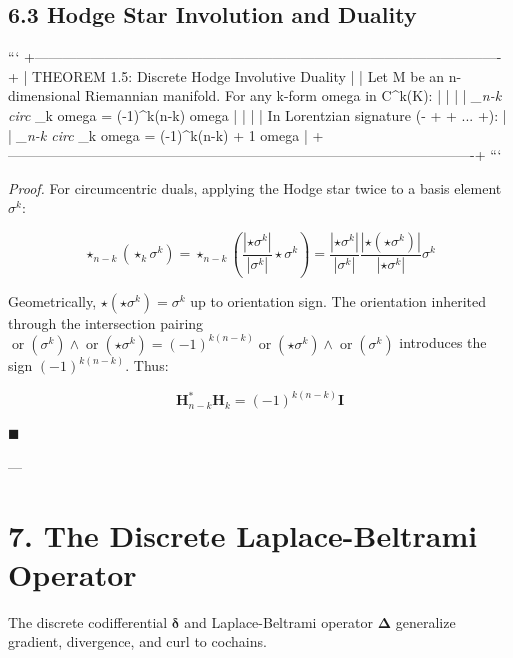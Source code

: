 \documentclass[11pt,twoside,openright]{amsbook}
\begin{document}
\subsection{6.3 Hodge Star Involution and Duality}

```
+----------------------------------------------------------------------------------------------------+
| THEOREM 1.5: Discrete Hodge Involutive Duality                                                     |
| Let M be an n-dimensional Riemannian manifold. For any k-form omega in C^k(K):                     |
|                                                                                                    |
|   \textit{_{n-k} circ }_k omega = (-1)^{k(n-k)} omega                                                     |
|                                                                                                    |
| In Lorentzian signature (- + + ... +):                                                             |
|   \textit{_{n-k} circ }_k omega = (-1)^{k(n-k) + 1} omega                                                 |
+----------------------------------------------------------------------------------------------------+
```

\textit{Proof.} For circumcentric duals, applying the Hodge star twice to a basis element $\sigma^k$:

$$\star_{n-k}(\star_k \sigma^k) = \star_{n-k} \left( \frac{|\star \sigma^k|}{|\sigma^k|} \star \sigma^k \right) = \frac{|\star \sigma^k|}{|\sigma^k|} \frac{|\star(\star \sigma^k)|}{|\star \sigma^k|} \sigma^k$$

Geometrically, $\star(\star \sigma^k) = \sigma^k$ up to orientation sign. The orientation inherited through the intersection pairing $\operatorname{or}(\sigma^k) \wedge \operatorname{or}(\star \sigma^k) = (-1)^{k(n-k)} \operatorname{or}(\star \sigma^k) \wedge \operatorname{or}(\sigma^k)$ introduces the sign $(-1)^{k(n-k)}$. Thus:

$$\mathbf{H}_{n-k}^* \mathbf{H}_k = (-1)^{k(n-k)} \mathbf{I}$$

$\blacksquare$

---

\section{7. The Discrete Laplace-Beltrami Operator}

The discrete codifferential $\boldsymbol{\delta}$ and Laplace-Beltrami operator $\boldsymbol{\Delta}$ generalize gradient, divergence, and curl to cochains.
\end{document}
